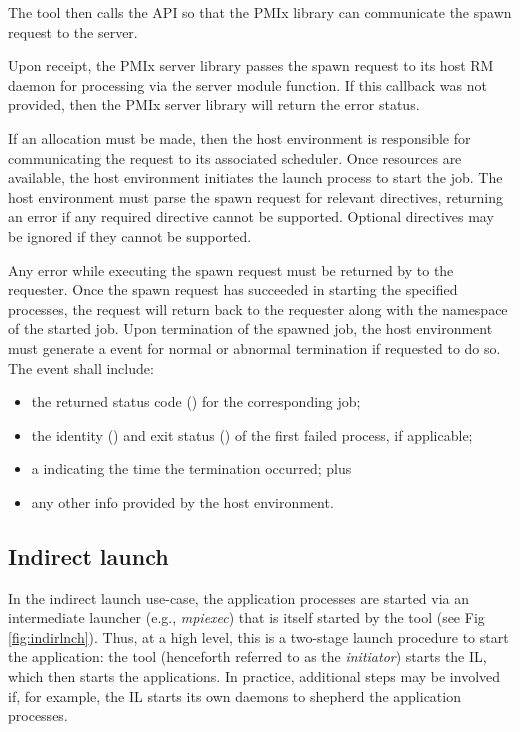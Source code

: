 The tool then calls the  \ac{API} so that the \ac{PMIx} library can communicate the spawn request to the server.

Upon receipt, the \ac{PMIx} server library passes the spawn request to its host \ac{RM} daemon for processing via the  server module function. If this callback was not provided, then the \ac{PMIx} server library will return the  error status.

If an allocation must be made, then the host environment is responsible for
communicating the request to its associated scheduler. Once resources are
available, the host environment initiates the launch process to start the job.
The host environment must parse the spawn request for relevant directives,
returning an error if any required directive cannot be supported. Optional
directives may be ignored if they cannot be supported.

Any error while executing the spawn request must be returned by
 to the requester. Once the spawn request has succeeded in
starting the specified processes, the request will return
 back to the requester along with the namespace of the
started job. Upon termination of the spawned job, the host environment must
generate a  event for normal or abnormal
termination if requested to do so. The event shall include:

\begin{itemize}
    \item the returned status code () for the
    corresponding job;
    \item the identity () and exit status
    () of the first failed process, if applicable;
    \item a  indicating the time the termination
    occurred; plus
    \item any other info provided by the host environment.
\end{itemize}

\subsection{Indirect launch}
\label{chap:api_tools:indirect}

In the indirect launch use-case, the application processes are started via an intermediate launcher (e.g., \emph{mpiexec}) that is itself started by the tool (see Fig \ref{fig:indirlnch}). Thus, at a high level, this is a two-stage launch procedure to start the application: the tool (henceforth referred to as the \emph{initiator}) starts the \ac{IL}, which then starts the applications. In practice, additional steps may be involved if, for example, the \ac{IL} starts its own daemons to shepherd the application processes.

